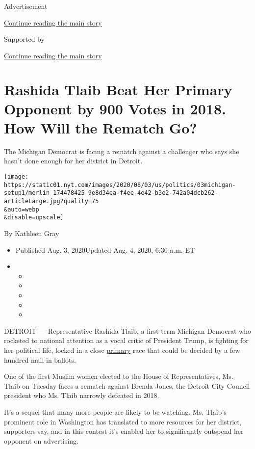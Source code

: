Advertisement

\protect\hyperlink{after-top}{Continue reading the main story}

Supported by

\protect\hyperlink{after-sponsor}{Continue reading the main story}

\hypertarget{rashida-tlaib-beat-her-primary-opponent-by-900-votes-in-2018-how-will-the-rematch-go}{%
\section{Rashida Tlaib Beat Her Primary Opponent by 900 Votes in 2018.
How Will the Rematch
Go?}\label{rashida-tlaib-beat-her-primary-opponent-by-900-votes-in-2018-how-will-the-rematch-go}}

The Michigan Democrat is facing a rematch against a challenger who says
she hasn't done enough for her district in Detroit.

\texttt{[image: https://static01.nyt.com/images/2020/08/03/us/politics/03michigan-setup1/merlin\_174478425\_9e8d34ea-f4ee-4e42-b3e2-742a04dcb262-articleLarge.jpg?quality=75\\\&auto=webp\\\&disable=upscale]}

By Kathleen Gray

\begin{itemize}
\item
  Published Aug. 3, 2020Updated Aug. 4, 2020, 6:30 a.m. ET
\item
  \begin{itemize}
  \item
  \item
  \item
  \item
  \item
  \end{itemize}
\end{itemize}

DETROIT --- Representative Rashida Tlaib, a first-term Michigan Democrat
who rocketed to national attention as a vocal critic of President Trump,
is fighting for her political life, locked in a close
\href{https://www.nytimes.com/2020/08/04/us/elections/primary-election-michigan-arizona-kansas.html}{primary}
race that could be decided by a few hundred mail-in ballots.

One of the first Muslim women elected to the House of Representatives,
Ms. Tlaib on Tuesday faces a rematch against Brenda Jones, the Detroit
City Council president who Ms. Tlaib narrowly defeated in 2018.

It's a sequel that many more people are likely to be watching. Ms.
Tlaib's prominent role in Washington has translated to more resources
for her district, supporters say, and in this contest it's enabled her
to significantly outspend her opponent on advertising.

